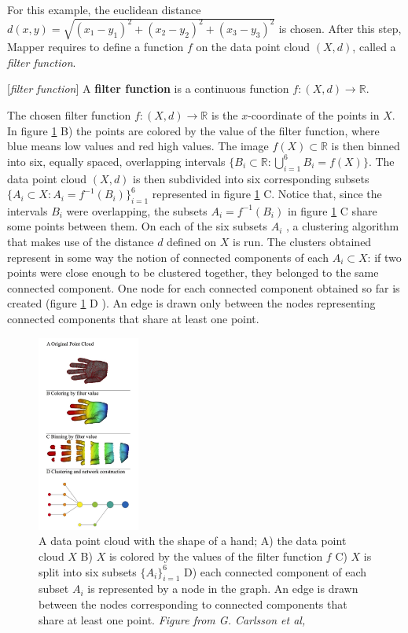 For this example, the euclidean distance $d(x,y)=\sqrt{(x_1-y_1)^2+(x_2-y_2)^2+(x_3-y_3)^2}$ is chosen. After this step, Mapper requires to define a function $f$ on the data point cloud $(X,d)$, called a \textit{filter function}. 
\begin{definition}{[\textit{filter function}]}
	A \textbf{filter function} is a continuous function $f \colon (X,d)\rightarrow \mathbb R$. 
\end{definition}
The chosen filter function $f : (X,d) \rightarrow \mathbb{R}$ is the $x$-coordinate of the points in $X$. In figure \ref{fig:hand} B) the points are colored by the value of the filter function, where blue means low values and red high values. The image $f(X)\subset \mathbb{R}$ is then binned into six, equally spaced, overlapping intervals $\{B_i\subset \mathbb R \colon \bigcup_{i=1}^6B_i = f(X)\}$. The data point cloud $(X,d)$ is then subdivided into six corresponding subsets $\{A_i\subset X \colon A_i = f^{-1 }(B_i)\}_{i=1}^6$ represented in figure \ref{fig:hand} C. Notice that, since the intervals $B_i$ were overlapping, the subsets $A_i=f^{-1}(B_i)$ in figure \ref{fig:hand} C share some points between them. On each of the six subsets $A_i$ , a clustering algorithm that makes use of the distance $d$ defined on $X$ is run. The clusters obtained represent in some way the notion of connected components of each $A_i\subset X$: if two points were close enough to be clustered together, they belonged to the same connected component. One node for each connected component obtained so far is created (figure \ref{fig:hand} D ). An edge is drawn only between the nodes representing connected components that share at least one point.

\begin{figure}[htbp!] 
	\centering    
	\includegraphics[width=0.3\textwidth]{mapper_first_example}
	\caption{A data point cloud with the shape of a hand; A) the data point cloud $X$ B) $X$ is colored by the values of the filter function $f$  C) $X$ is split into six subsets $\{A_i\}_{i=1}^6$ D) each connected component of each subset $A_i$ is represented by a node in the graph. An edge is drawn between the nodes corresponding to connected components that share at least one point. \textit{Figure from G. Carlsson et al, \cite{extracting_insights}}}
	\label{fig:hand}
\end{figure}


